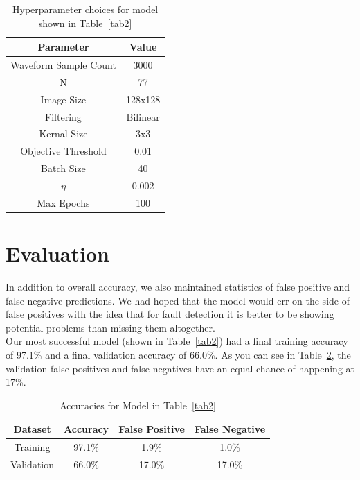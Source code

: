 \documentclass[conference]{IEEEtran}
\begin{document}
\begin{table}[htbp]
\caption{Hyperparameter choices for model shown in Table~\ref{tab2}}
\begin{center}
\begin{tabular}{|c|c|}
\hline
\textbf{Parameter}&\textbf{Value} \\
\cline{2-2} 
\hline
Waveform Sample Count & 3000 \\
N & 77 \\
Image Size & 128x128 \\
Filtering & Bilinear \\
Kernal Size & 3x3 \\
Objective Threshold & 0.01 \\
Batch Size & 40 \\
$\eta$ & 0.002 \\
Max Epochs & 100 \\
\hline
\end{tabular}
\label{param1}
\end{center}
\end{table}

\section{Evaluation}

In addition to overall accuracy, we also maintained statistics of false positive and false negative predictions. We had hoped that the model would err on the side of false positives with the idea that for fault detection it is better to be showing potential problems than missing them altogether.\\
Our most successful model (shown in Table~\ref{tab2}) had a final training accuracy of 97.1\% and a final validation accuracy of 66.0\%. As you can see in Table~\ref{acc1}, the validation false positives and false negatives have an equal chance of happening at 17\%. 

\begin{table}[htbp]
\caption{Accuracies for Model in Table~\ref{tab2}}
\begin{center}
\begin{tabular}{|c|c|c|c|}
\hline
\textbf{Dataset}&\textbf{Accuracy}&\textbf{False Positive}&\textbf{False Negative} \\
\cline{2-4} 
\hline
 Training & 97.1\% & 1.9\% & 1.0\% \\
 Validation & 66.0\% & 17.0\% & 17.0\% \\
\hline
\end{tabular}
\label{acc1}
\end{center}
\end{table}
\end{document}
